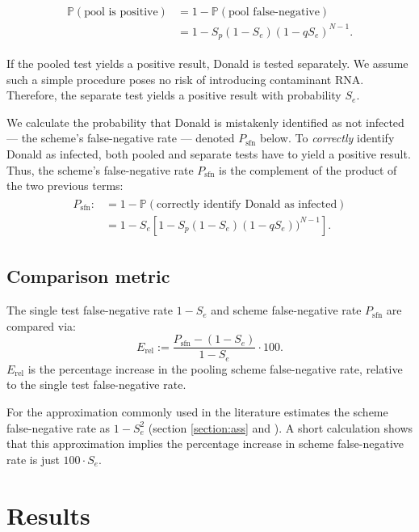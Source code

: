 \documentclass{article}
\newcommand{\Se}{S_e}
\newcommand{\Sp}{S_p}
\newcommand{\mi}{P_{\text{sfn}}}
\newcommand{\rel}{E_{\text{rel}}}
\renewcommand{\Pr}{\mathbb{P}}
\begin{document}
\begin{align}
    \begin{split}
        \Pr(\text{pool is positive}) &= 1 - \Pr(\text{pool false-negative}) \\
        &= 1 - \Sp(1-\Se)(1-q\Se)^{N-1}.
    \end{split}
\end{align}

If the pooled test yields a positive result, Donald is tested separately. We assume such a simple procedure poses no risk of introducing contaminant RNA. Therefore, the separate test yields a positive result with probability $\Se$. 

We calculate the probability that Donald is mistakenly identified as not infected --- the scheme's false-negative rate --- denoted $\mi$ below. To \emph{correctly} identify Donald as infected, both pooled and separate tests have to yield a positive result. Thus, the scheme's false-negative rate $\mi$ is the complement of the product of the two previous terms:
\begin{align}\label{eq:sfn}
    \begin{split}
        \mi :&= 1-\Pr(\text{correctly identify Donald as infected})\\
        &= 1 - \Se\left [1 - \Sp(1-\Se)(1-q\Se))^{N-1}\right].
    \end{split}
\end{align}

\subsection{Comparison metric}
The single test false-negative rate $1-\Se$ and scheme false-negative rate $\mi$ are compared via:
\begin{equation}\label{eq:erel}
\rel := \frac{\mi - (1-\Se)}{1-\Se} \cdot 100.
\end{equation}
$\rel$ is the percentage increase in the pooling scheme false-negative rate, relative to the single test false-negative rate.

For the approximation commonly used in the literature estimates the scheme false-negative rate as $1-\Se^2$ (section \ref{section:ass} and \cite{Simplistic1, Simplistic2, Kim, OptimalDorfmanPool}). A short calculation shows that this approximation implies the percentage increase in scheme false-negative rate is just $100\cdot \Se$.

\section{Results}\label{section:results}
\end{document}
